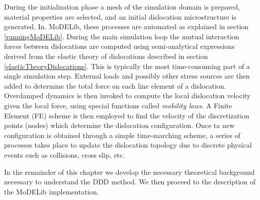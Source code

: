  During the initialization phase a mesh of the simulation domain is prepared, material properties are selected, and an initial dislocation microstructure is generated. In. MoDELib, these processes are automated as explained in section \ref{runningMoDELib}. During the main simulation loop the mutual interaction forces between dislocations are computed using semi-analytical expressions derived from the elastic theory of dislocations described in section \ref{elasticTheoryDislocations}. This is typically the most time-consuming part of a single simulation step. External loads and possibly other stress sources are then added to determine the total force on each line element of a dislocation. Overdamped dynamics is then invoked to compute the local dislocation velocity given the local force, using special functions called \textit{mobility laws}. A Finite Element (FE) scheme is then employed to find the velocity of the discretization points (nodes) which determine the dislocation configuration. Once ta new configuration is obtained through a simple time-marching scheme, a series of processes takes place to update the dislocation topology due to discrete physical events such as collisions, cross slip, etc.

In the remainder of this chapter we develop the necessary theoretical background necessary to understand the  DDD method. We then proceed to the description of the MoDELib implementation. 




